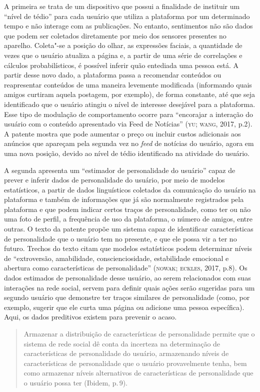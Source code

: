 A primeira se trata de um dispositivo que possui a finalidade de
instituir um ``nível de tédio'' para cada usuário que utiliza a
plataforma por um determinado tempo e não interage com as publicações.
No entanto, sentimentos não são dados que podem ser coletados
diretamente por meio dos sensores presentes no aparelho. Coleta"-se a
posição do olhar, as expressões faciais, a quantidade de vezes que o
usuário atualiza a página e, a partir de uma série de correlações e
cálculos probabilísticos, é possível inferir quão entediada uma pessoa
está. A partir desse novo dado, a plataforma passa a recomendar
conteúdos ou reapresentar conteúdos de uma maneira levemente modificada
(informando quais amigos curtiram aquela postagem, por exemplo), de
forma constante, até que seja identificado que o usuário atingiu o nível
de interesse desejável para a plataforma. Esse tipo de modulação de
comportamento ocorre para ``encorajar a interação do usuário com o
conteúdo apresentado via Feed de Notícias'' (\textsc{yu; wang}, 2017, p.2). A
patente mostra que pode aumentar o preço ou incluir custos adicionais
aos anúncios que apareçam pela segunda vez no \emph{feed} de notícias do usuário,
agora em uma nova posição, devido ao nível de tédio identificado na
atividade do usuário.

A segunda apresenta um ``estimador de personalidade do usuário'' capaz
de prever e inferir dados de personalidade do usuário, por meio de
modelos estatísticos, a partir de dados linguísticos coletados da
comunicação do usuário na plataforma e também de informações que já são
normalmente registrados pela plataforma e que podem indicar certos
traços de personalidade, como ter ou não uma foto de perfil, a
frequência de uso da plataforma, o número de amigos, entre outras. O
texto da patente propõe um sistema capaz de identificar características
de personalidade que o usuário tem no presente, e que ele possa vir a
ter no futuro. Trechos do texto citam que modelos estatísticos podem
determinar níveis de ``extroversão, amabilidade, conscienciosidade,
estabilidade emocional e abertura como características de
personalidade'' (\textsc{nowak; eckles}, 2017, p.8). Os dados estimados de
personalidade desse usuário, ao serem relacionados com suas interações
na rede social, servem para definir quais ações serão sugeridas para um
segundo usuário que demonstre ter traços similares de personalidade
(como, por exemplo, sugerir que ele curta uma página ou adicione uma
pessoa específica). Aqui, os dados preditivos existem para prevenir o
acaso.

\begin{quote}
Armazenar a distribuição de características de personalidade permite que
o sistema de rede social dê conta da incerteza na determinação de
características de personalidade do usuário, armazenando níveis de
características de personalidade que o usuário provavelmente tenha, bem
como armazenar níveis alternativos de características de personalidade
que o usuário possa ter (Ibidem, p.\,9).
\end{quote}

